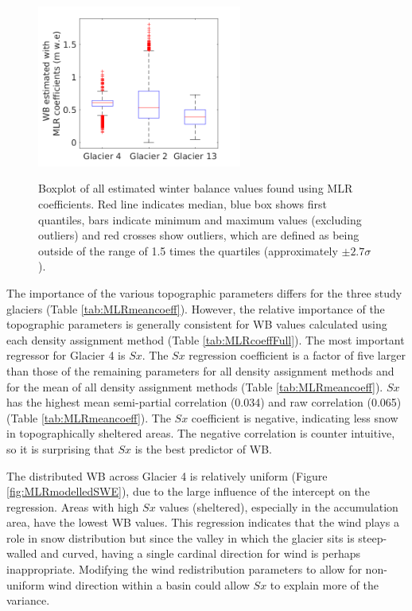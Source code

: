 \documentclass{sfuthesis}
\newcommand{\boxMatlab}{Red line indicates median, blue box shows first quantiles, bars indicate minimum and maximum values (excluding outliers) and red crosses show outliers, which are defined as being outside of the range of 1.5 times the quartiles (approximately $\pm2.7\sigma$). }
\begin{document}
{\begin{figure}[H]
\centering
	\includegraphics[width =0.6\textwidth]{ModelledSWE_box_MLR.png}\\
\caption[Boxplot of all estimated winter balance values found using MLR coefficients]{Boxplot of all estimated winter balance values found using MLR coefficients. \boxMatlab}
\label{fig:MLRsweboxplot}
\end{figure} 

The importance of the various topographic parameters differs for the three study glaciers (Table \ref{tab:MLRmeancoeff}). However, the relative importance of the topographic parameters is generally consistent for WB values calculated using each density assignment method (Table \ref{tab:MLRcoeffFull}). The most important regressor for Glacier 4 is $Sx$. The $Sx$ regression coefficient is a factor of five larger than those of the remaining parameters for all density assignment methods  and for the mean of all density assignment methods (Table \ref{tab:MLRmeancoeff}). $Sx$ has the highest mean semi-partial correlation (0.034)  and raw correlation (0.065) (Table \ref{tab:MLRmeancoeff}). The $Sx$ coefficient is negative, indicating less snow in topographically sheltered areas. The negative correlation is counter intuitive, so it is surprising that $Sx$ is the best predictor of WB.

The distributed WB across Glacier 4 is relatively uniform (Figure \ref{fig:MLRmodelledSWE}), due to the large influence of the intercept on the regression. Areas with high $Sx$ values (sheltered), especially in the accumulation area, have the lowest WB values. This regression indicates that the wind plays a role in snow distribution but since the valley in which the glacier sits is steep-walled and curved, having a single cardinal direction for wind is perhaps inappropriate. Modifying the wind redistribution parameters to allow for non-uniform wind direction within a basin could allow $Sx$ to explain more of the variance. 

}
\end{document}
